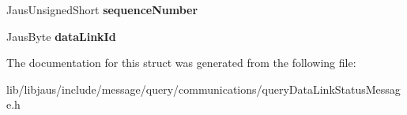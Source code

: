 \begin{DoxyCompactItemize}
\item 
\hypertarget{struct_query_data_link_status_message_struct_ad136ec971c9e12d99bc9794f03ea05f6}{\-Jaus\-Unsigned\-Short {\bfseries sequence\-Number}}\label{struct_query_data_link_status_message_struct_ad136ec971c9e12d99bc9794f03ea05f6}

\item 
\hypertarget{struct_query_data_link_status_message_struct_a407c16e44d9952994cff806c191df367}{\-Jaus\-Byte {\bfseries data\-Link\-Id}}\label{struct_query_data_link_status_message_struct_a407c16e44d9952994cff806c191df367}

\end{DoxyCompactItemize}


\-The documentation for this struct was generated from the following file\-:\begin{DoxyCompactItemize}
\item 
lib/libjaus/include/message/query/communications/query\-Data\-Link\-Status\-Message.\-h\end{DoxyCompactItemize}
